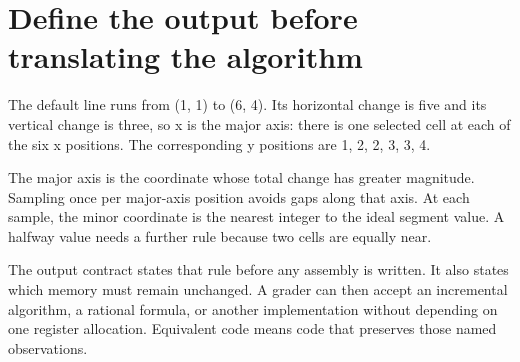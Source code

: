 \section{Define the output before translating the
  algorithm}\label{007-bresenham-line-p01-define-the-output-before-translating-the-algorithm}

The default line runs from (1, 1) to (6, 4). Its horizontal change is
five and its vertical change is three, so x is the major axis: there is
one selected cell at each of the six x positions. The corresponding y
positions are 1, 2, 2, 3, 3, 4.

The major axis is the coordinate whose total change has greater
magnitude. Sampling once per major-axis position avoids gaps along that
axis. At each sample, the minor coordinate is the nearest integer to the
ideal segment value. A halfway value needs a further rule because two
cells are equally near.

The output contract states that rule before any assembly is written. It
also states which memory must remain unchanged. A grader can then accept
an incremental algorithm, a rational formula, or another implementation
without depending on one register allocation. Equivalent code means code
that preserves those named observations.
